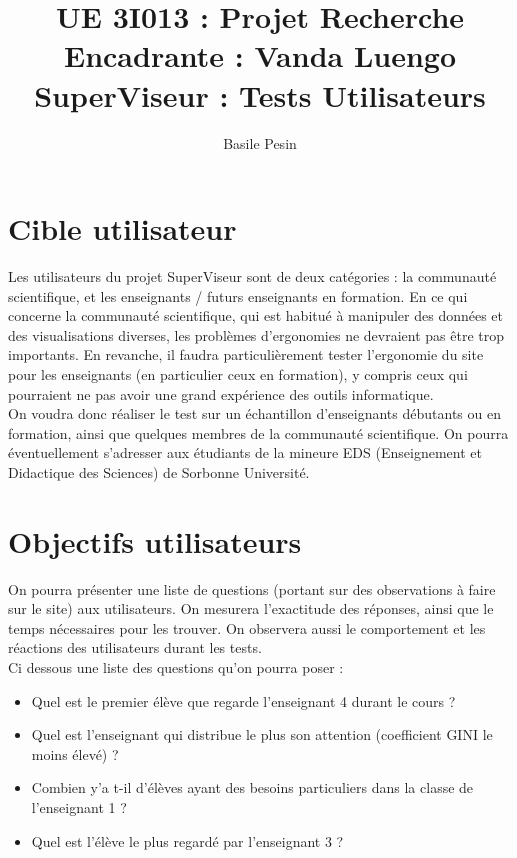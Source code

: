\documentclass{article}
\title{UE 3I013 : Projet Recherche\\
    Encadrante : Vanda Luengo\\
    SuperViseur : Tests Utilisateurs}
\author{Basile Pesin}
\begin{document}
\maketitle
\newpage

\section{Cible utilisateur}
Les utilisateurs du projet SuperViseur sont de deux catégories : la communauté scientifique, et les enseignants / futurs enseignants en formation. En ce qui concerne la communauté scientifique, qui est habitué à manipuler des données et des visualisations diverses, les problèmes d'ergonomies ne devraient pas être trop importants. En revanche, il faudra particulièrement tester l'ergonomie du site pour les enseignants (en particulier ceux en formation), y compris ceux qui pourraient ne pas avoir une grand expérience des outils informatique.\\
On voudra donc réaliser le test sur un échantillon d'enseignants débutants ou en formation, ainsi que quelques membres de la communauté scientifique. On pourra éventuellement s'adresser aux étudiants de la mineure EDS (Enseignement et Didactique des Sciences) de Sorbonne Université.

\section{Objectifs utilisateurs}
On pourra présenter une liste de questions (portant sur des observations à faire sur le site) aux utilisateurs. On mesurera l'exactitude des réponses, ainsi que le temps nécessaires pour les trouver. On observera aussi le comportement et les réactions des utilisateurs durant les tests.\\
Ci dessous une liste des questions qu'on pourra poser :
\begin{itemize}
    \item Quel est le premier élève que regarde l'enseignant 4 durant le cours ?
    \item Quel est l'enseignant qui distribue le plus son attention (coefficient GINI le moins élevé) ?
    \item Combien y'a t-il d'élèves ayant des besoins particuliers dans la classe de l'enseignant 1 ?
    \item Quel est l'élève le plus regardé par l'enseignant 3 ? 
\end{itemize}
\end{document}
